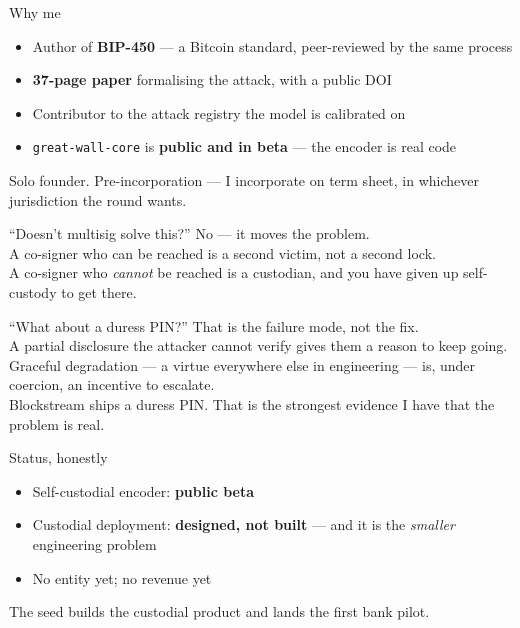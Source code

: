 \documentclass[aspectratio=169,12pt]{beamer}
\newcommand{\quiet}[1]{{\color{muted}#1}}
\begin{document}
\begin{frame}[t]{Why me}
  \vspace{0.8cm}
  \begin{itemize}\setlength\itemsep{0.5em}
    \item Author of \textbf{BIP-450} --- a Bitcoin standard, peer-reviewed by the same process
    \item \textbf{37-page paper} formalising the attack, with a public DOI
    \item Contributor to the attack registry the model is calibrated on
    \item \texttt{great-wall-core} is \textbf{public and in beta} --- the encoder is real code
  \end{itemize}
  \vfill
  \quiet{Solo founder. Pre-incorporation --- I incorporate on term sheet, in whichever
  jurisdiction the round wants.}
\end{frame}

\begin{frame}[t]{``Doesn't multisig solve this?''}
  \vspace{1.0cm}
  {\Large No --- it moves the problem.}\\[0.8cm]
  A co-signer who can be reached is a second victim, not a second lock.\\[0.4cm]
  A co-signer who \emph{cannot} be reached is a custodian, and you have
  given up self-custody to get there.
\end{frame}

\begin{frame}[t]{``What about a duress PIN?''}
  \vspace{1.0cm}
  {\Large That is the failure mode, not the fix.}\\[0.8cm]
  A partial disclosure the attacker cannot verify gives them a reason to
  keep going. Graceful degradation --- a virtue everywhere else in
  engineering --- is, under coercion, an incentive to escalate.\\[0.5cm]
  \quiet{Blockstream ships a duress PIN. That is the strongest evidence I have
  that the problem is real.}
\end{frame}

\begin{frame}[t]{Status, honestly}
  \vspace{0.9cm}
  \begin{itemize}\setlength\itemsep{0.5em}
    \item Self-custodial encoder: \textbf{public beta}
    \item Custodial deployment: \textbf{designed, not built} --- and it is the
          \emph{smaller} engineering problem
    \item No entity yet; no revenue yet
  \end{itemize}
  \vfill
  \quiet{The seed builds the custodial product and lands the first bank pilot.}
\end{frame}
\end{document}

